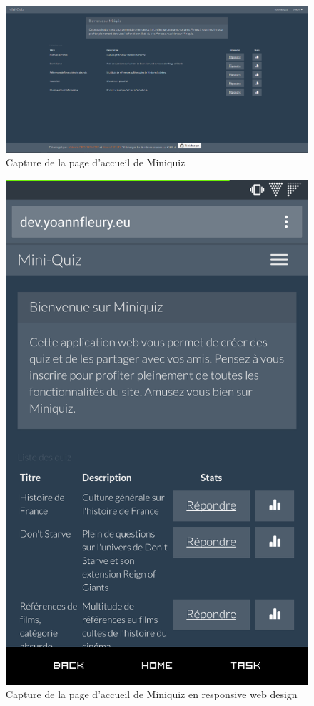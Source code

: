 \documentclass[12pt]{article}
\begin{document}
        \begin{figure}[!ht]
            \caption{\label{fig:miniquiz-home} Capture de la page d'accueil de Miniquiz}
            \includegraphics[width=\textwidth]{res/miniquiz-home.png}
        \end{figure}
        \begin{figure}[!ht]
            \caption{\label{fig:miniquiz-home-rwd} Capture de la page d'accueil de Miniquiz en responsive web design}
            \includegraphics[scale=0.2]{res/miniquiz-home-rwd.png}
        \end{figure}
\end{document}
